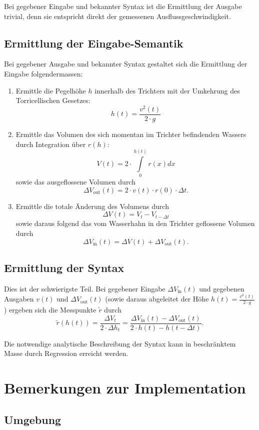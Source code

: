 \documentclass[11pt]{scrreprt} %
\theoremstyle{definition}
\begin{document}
Bei gegebener Eingabe und bekannter Syntax ist die Ermittlung der Ausgabe trivial, denn sie entspricht direkt der gemessenen Ausflussgeschwindigkeit.

\section{Ermittlung der Eingabe-Semantik}

Bei gegebener Ausgabe und bekannter Syntax gestaltet sich die Ermittlung der Eingabe folgendermassen:

\begin{enumerate}
\item Ermittle die Pegelhöhe $h$ innerhalb des Trichters mit der Umkehrung des Torricellischen Gesetzes:
\[
	h(t) = \frac {v^2(t)}{2\cdot g}
\]
\item Ermittle das Volumen des sich momentan im Trichter befindenden Wassers durch Integration über $r(h)$:
\[
	V(t) = 2\cdot \int\limits_0^{h(t)} r(x) dx
\]
sowie das ausgeflossene Volumen durch
\[
	\Delta V_\text{out}(t) = 2\cdot v(t) \cdot r(0) \cdot \Delta t.
\]
\item Ermittle die totale Änderung des Volumens durch
\[
	\Delta V(t) = V_t - V_{t-\Delta t}
\]
sowie daraus folgend das vom Wasserhahn in den Trichter geflossene Volumen durch
\[
	\Delta V_\text{in}(t) = \Delta V(t) + \Delta V_\text{out}(t).
\]
\end{enumerate}

\section{Ermittlung der Syntax}

Dies ist der schwierigste Teil. Bei gegebener Eingabe $\Delta V_\text{in}(t)$ und gegebenen Ausgaben $v(t)$ und $\Delta V_\text{out}(t)$ (sowie daraus abgeleitet der Höhe $h(t) = \frac {v^2(t)}{2\cdot g}$) ergeben sich die Messpunkte $\tilde r$ durch
\[
	\tilde r(h(t)) = \frac {\Delta V_t}{2 \cdot \Delta h_t} = \frac {\Delta V_\text{in}(t)-\Delta V_\text{out}(t)} {2 \cdot h(t) - h(t-\Delta t)}.
\]

Die notwendige analytische Beschreibung der Syntax kann in beschränktem Masse durch Regression erreicht werden.

\chapter{Bemerkungen zur Implementation}

\section{Umgebung}
\end{document}
